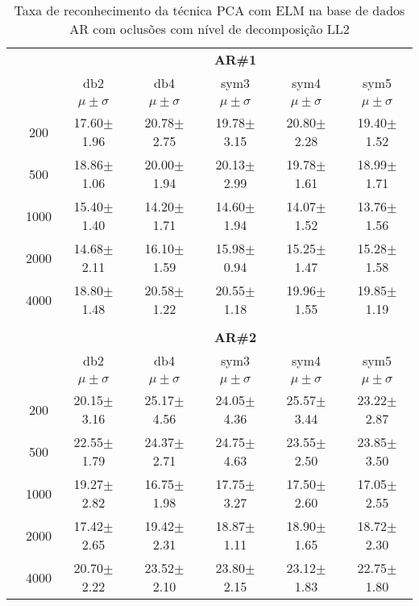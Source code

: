 \begin{table}[H] 
	\centering
    \normalsize
	\caption{Taxa de reconhecimento da técnica PCA com ELM na base de dados AR com oclusões com nível de decomposição LL2}
	\begin{tabular}{|c|c|c c c c c|}
\cline{3-7}
\multicolumn{2}{c|}{\multirow{3}{*}{}} & \multicolumn{5}{c|}{\textbf{AR\#1}}   \\\cline{3-7} 
\multicolumn{2}{c|}{}  & db2 & db4 & sym3 & sym4 & sym5 \\\cline{3-7}%
\multicolumn{2}{c|}{}& $\mu \pm \sigma$ & $\mu \pm \sigma$ & $\mu \pm \sigma$ & $\mu \pm \sigma$ & $\mu \pm \sigma$ \\\hline


\multicolumn{1}{|c|}{ \multirow{5}{*}{\rotatebox[origin=c]{90}{\textbf{Neurônios}}} }
&200	&17.60$\pm$1.96	&20.78$\pm$2.75	&19.78$\pm$3.15	&20.80$\pm$2.28	&19.40$\pm$1.52\\\cline{2-7}
&500	&18.86$\pm$1.06	&20.00$\pm$1.94	&20.13$\pm$2.99	&19.78$\pm$1.61 &18.99$\pm$1.71\\\cline{2-7}
&1000	&15.40$\pm$1.40	&14.20$\pm$1.71	&14.60$\pm$1.94	&14.07$\pm$1.52	&13.76$\pm$1.56\\\cline{2-7}
&2000	&14.68$\pm$2.11	&16.10$\pm$1.59	&15.98$\pm$0.94	&15.25$\pm$1.47 &15.28$\pm$1.58\\\cline{2-7}
&4000	&18.80$\pm$1.48	&20.58$\pm$1.22	&20.55$\pm$1.18	&19.96$\pm$1.55	&19.85$\pm$1.19



\\\midrule%

\multicolumn{7}{c}{}\\ 

\cline{3-7}
\multicolumn{2}{c|}{\multirow{3}{*}{}} & \multicolumn{5}{c|}{\textbf{AR\#2}}   \\\cline{3-7} 

\multicolumn{2}{c|}{}  & db2 & db4 & sym3 & sym4 & sym5 \\\cline{3-7}
\multicolumn{2}{c|}{}& $\mu \pm \sigma$ & $\mu \pm \sigma$ & $\mu \pm \sigma$ & $\mu \pm \sigma$ & $\mu \pm \sigma$ \\\hline


\multicolumn{1}{|c|}{ \multirow{5}{*}{\rotatebox[origin=c]{90}{\textbf{Neurônios}}} }
&200	&20.15$\pm$3.16	&25.17$\pm$4.56	&24.05$\pm$4.36	&25.57$\pm$3.44	&23.22$\pm$2.87\\\cline{2-7}
&500	&22.55$\pm$1.79	&24.37$\pm$2.71	&24.75$\pm$4.63	&23.55$\pm$2.50	&23.85$\pm$3.50\\\cline{2-7}
&1000	&19.27$\pm$2.82	&16.75$\pm$1.98	&17.75$\pm$3.27	&17.50$\pm$2.60	&17.05$\pm$2.55\\\cline{2-7}
&2000	&17.42$\pm$2.65	&19.42$\pm$2.31	&18.87$\pm$1.11	&18.90$\pm$1.65	&18.72$\pm$2.30\\\cline{2-7}
&4000	&20.70$\pm$2.22 &23.52$\pm$2.10	&23.80$\pm$2.15 &23.12$\pm$1.83	&22.75$\pm$1.80




\end{tabular}
\end{table}
